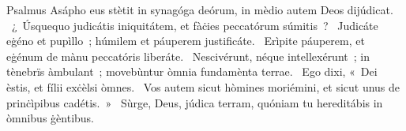 { Psalmus Asápho}
{%
eus stètit in synagóga deórum, in mèdio autem Deos dijúdicat. 
~¿~Úsquequo judicátis iniquitátem, et fàċies peccatórum súmitis~? 
~Judicáte eġéno et pupìllo~; húmilem et páuperem justificáte. 
~Erìpite páuperem, et eġénum de mànu peccatóris liberáte. 
~Nescivérunt, néque intellexérunt~; in tènebrïs àmbulant~; movebùntur òmnia fundamènta terrae. 
~Ego dixi, «~Dei èstis, et fílii exċèlsi òmnes. 
~Vos autem sicut hòmines moriémini, et sicut unus de prinċìpibus cadétis.~»
~Sùrge, Deus, júdica terram, quóniam tu hereditábis in òmnibus ġèntibus. 
}
